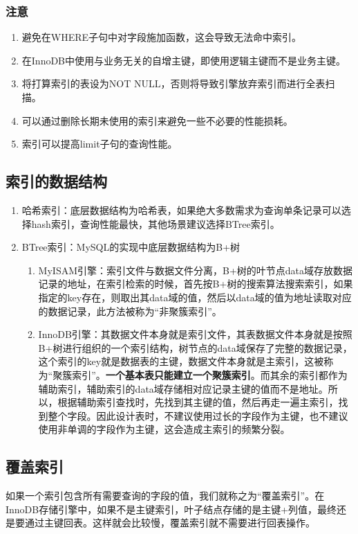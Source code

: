\documentclass[main.tex]{subfiles}
\begin{document}
\subsubsection{注意}
\begin{enumerate}
    \item 避免在WHERE子句中对字段施加函数，这会导致无法命中索引。
    \item 在InnoDB中使用与业务无关的自增主键，即使用逻辑主键而不是业务主键。
    \item 将打算索引的表设为NOT NULL，否则将导致引擎放弃索引而进行全表扫描。
    \item 可以通过删除长期未使用的索引来避免一些不必要的性能损耗。
    \item 索引可以提高limit子句的查询性能。
\end{enumerate}

\subsection{索引的数据结构}
\begin{enumerate}
    \item 哈希索引：底层数据结构为哈希表，如果绝大多数需求为查询单条记录可以选择hash索引，查询性能最快，其他场景建议选择BTree索引。
    \item BTree索引：MySQL的实现中底层数据结构为B+树
        \begin{enumerate}
            \item MyISAM引擎：索引文件与数据文件分离，B+树的叶节点data域存放数据记录的地址，在索引检索的时候，首先按B+树的搜索算法搜索索引，如果指定的key存在，则取出其data域的值，然后以data域的值为地址读取对应的数据记录，此方法被称为“非聚簇索引”。
            \item InnoDB引擎：其数据文件本身就是索引文件，其表数据文件本身就是按照B+树进行组织的一个索引结构，树节点的data域保存了完整的数据记录，这个索引的key就是数据表的主键，数据文件本身就是主索引，这被称为“聚簇索引”。{\bfseries 一个基本表只能建立一个聚簇索引}。而其余的索引都作为辅助索引，辅助索引的data域存储相对应记录主键的值而不是地址。所以，根据辅助索引查找时，先找到其主键的值，然后再走一遍主索引，找到整个字段。因此设计表时，不建议使用过长的字段作为主键，也不建议使用非单调的字段作为主键，这会造成主索引的频繁分裂。
        \end{enumerate}
\end{enumerate}

\subsection{覆盖索引}
如果一个索引包含所有需要查询的字段的值，我们就称之为“覆盖索引”。在InnoDB存储引擎中，如果不是主键索引，叶子结点存储的是主键+列值，最终还是要通过主键回表。这样就会比较慢，覆盖索引就不需要进行回表操作。
\end{document}

